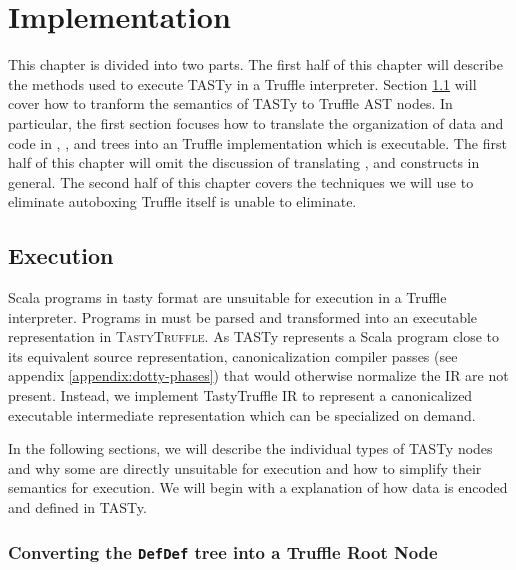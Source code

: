 \chapter{Implementation}
\label{chapter:implementation}

This chapter is divided into two parts.
The first half of this chapter will describe the methods used to execute TASTy in a Truffle interpreter.
Section \ref{impl:section:execution} will cover how to tranform the semantics of TASTy to Truffle AST nodes.
In particular, the first section focuses how to translate the organization of data and code in , , and  trees into an Truffle implementation which is executable.
The first half of this chapter will omit the discussion of translating ,  and  constructs in general. 
The second half of this chapter covers the techniques we will use to eliminate autoboxing Truffle itself is unable to eliminate. 

\section{Execution}
\label{impl:section:execution}

Scala programs in \acrshort{tasty} format are unsuitable for execution in a Truffle interpreter. 
Programs in must be parsed and transformed into an executable representation in \textsc{TastyTruffle}. 
As TASTy represents a Scala program close to its equivalent source representation, canonicalization compiler passes (see appendix \ref{appendix:dotty-phases}) that would otherwise normalize the IR are not present. 
Instead, we implement TastyTruffle IR to represent a canonicalized executable intermediate representation which can be specialized on demand. 

In the following sections, we will describe the individual types of TASTy nodes and why some are directly unsuitable for execution and how to simplify their semantics for execution.
We will begin with a explanation of how data is encoded and defined in TASTy.

\subsection{Converting the \texttt{DefDef} tree into a Truffle Root Node}
\label{impl:subsection:defdef}

